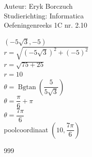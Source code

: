 \documentclass[a4paper]{article}
\begin{document}
  
\noindent \large Auteur: Eryk Borczuch \\
\noindent \large Studierichting: Informatica\\
\noindent \large Oefeningenreeks 1C nr. 2.10\\

\medskip

\normalsize

$(-5 \sqrt{3}, -5)$\\

$r = \sqrt{(-5 \sqrt{3})^2 + (-5)^2}$\\

$r = \sqrt{75+25}$\\

$r = 10$\\

$\theta = \operatorname{Bgtan}\left (\dfrac{5}{5 \sqrt{3}} \right)$\\

$\theta = \dfrac{\pi}{6} + \pi$\\

$\theta = \dfrac{7\pi}{6}$\\

poolcoordinaat $\left(10, \dfrac{7\pi}{6}\right)$\\
\begin{thebibliography}{999}
\end{thebibliography}
\end{document}

